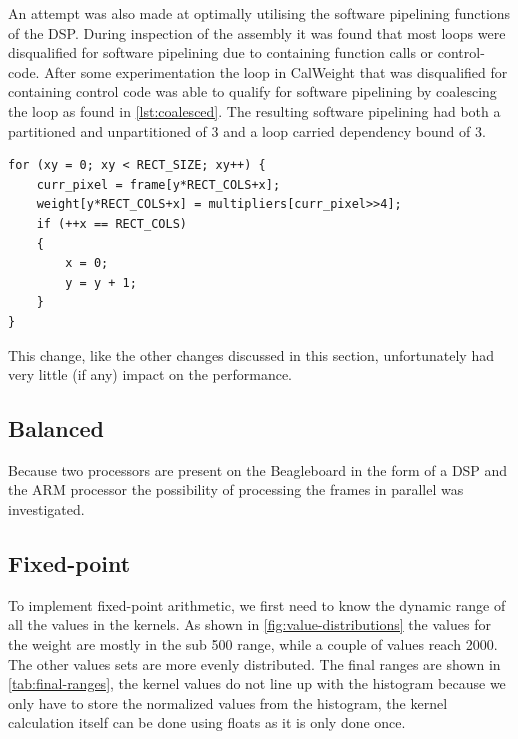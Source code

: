 \documentclass[final]{article}
\begin{document}
An attempt was also made at optimally utilising the software pipelining functions of the DSP. During inspection of the assembly it was found that most loops were disqualified for software pipelining due to containing function calls or control-code. After some experimentation the loop in CalWeight that was disqualified for containing control code was able to qualify for software pipelining by coalescing the loop as found in \cref{lst:coalesced}. The resulting software pipelining had both a partitioned and unpartitioned of 3 and a loop carried dependency bound of 3. 
\begin{lstlisting}[style=c, caption=Coalesced loop for weight calculation, label=lst:coalesced]
for (xy = 0; xy < RECT_SIZE; xy++) {
    curr_pixel = frame[y*RECT_COLS+x];
    weight[y*RECT_COLS+x] = multipliers[curr_pixel>>4];
    if (++x == RECT_COLS)
    {
        x = 0;
        y = y + 1;
    }
}
\end{lstlisting} 
This change, like the other changes discussed in this section, unfortunately had very little (if any) impact on the performance.

\subsection{Balanced}
Because two processors are present on the Beagleboard in the form of a DSP and the ARM processor the possibility of processing the frames in parallel was investigated.

\subsection{Fixed-point}
To implement fixed-point arithmetic, we first need to know the dynamic range of all the values in the kernels.
As shown in \cref{fig:value-distributions} the values for the weight are mostly in the sub \num{500} range, while a couple of values reach \num{2000}.
The other values sets are more evenly distributed.
The final ranges are shown in \cref{tab:final-ranges}, the kernel values do not line up with the histogram because we only have to store the normalized values from the histogram, the kernel calculation itself can be done using floats as it is only done once.
\end{document}

